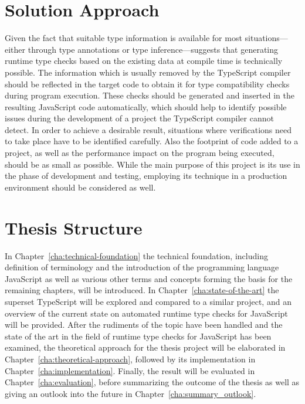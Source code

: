 \section{Solution Approach}
\label{sec:solution-approach}

Given the fact that suitable type information is available for most situations---either through type annotations or type inference---suggests that generating runtime type checks based on the existing data at compile time is technically possible. The information which is usually removed by the TypeScript compiler should be reflected in the target code to obtain it for type compatibility checks during program execution. These checks should be generated and inserted in the resulting JavaScript code automatically, which should help to identify possible issues during the development of a project the TypeScript compiler cannot detect. In order to achieve a desirable result, situations where verifications need to take place have to be identified carefully. Also the footprint of code added to a project, as well as the performance impact on the program being executed, should be as small as possible. While the main purpose of this project is its use in the phase of development and testing, employing its technique in a production environment should be considered as well.

\section{Thesis Structure}
\label{sec:thesis-structure}

In Chapter~\ref{cha:technical-foundation} the technical foundation, including definition of terminology and the introduction of the programming language JavaScript as well as various other terms and concepts forming the basis for the remaining chapters, will be introduced. In Chapter~\ref{cha:state-of-the-art} the superset TypeScript will be explored and compared to a similar project, and an overview of the current state on automated runtime type checks for JavaScript will be provided. After the rudiments of the topic have been handled and the state of the art in the field of runtime type checks for JavaScript has been examined, the theoretical approach for the thesis project will be elaborated in Chapter~\ref{cha:theoretical-approach}, followed by its implementation in Chapter~\ref{cha:implementation}. Finally, the result will be evaluated in Chapter~\ref{cha:evaluation}, before summarizing the outcome of the thesis as well as giving an outlook into the future in Chapter~\ref{cha:summary_outlook}.
